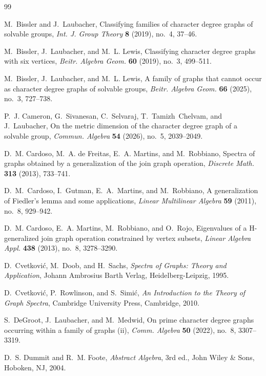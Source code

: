 \documentclass[11pt]{amsart}
\begin{document}
\begin{thebibliography}{99}


M.~Bissler and J.~Laubacher, 
Classifying families of character degree graphs of solvable groups, 
\textit{Int. J. Group Theory} \textbf{8} (2019), no.~4, 37--46.

M.~Bissler, J.~Laubacher, and M.~L. Lewis, 
Classifying character degree graphs with six vertices, 
\textit{Beitr. Algebra Geom.} \textbf{60} (2019), no.~3, 499--511.

M.~Bissler, J.~Laubacher, and M.~L. Lewis, 
A family of graphs that cannot occur as character degree graphs of solvable groups, \textit{Beitr. Algebra Geom.} \textbf{66} (2025), no.~3, 727--738.

P.~J. Cameron, G.~Sivanesan, C.~Selvaraj, T.~Tamizh~Chelvam, and J.~Laubacher, 
On the metric dimension of the character degree graph of a solvable group, 
\textit{Commun. Algebra} \textbf{54} (2026), no.~5, 2039--2049.

D.~M. Cardoso, M.~A. de Freitas, E.~A. Martins, and M.~Robbiano, 
Spectra of graphs obtained by a generalization of the join graph operation, 
\textit{Discrete Math.} \textbf{313} (2013), 733--741.

D.~M.~Cardoso, I.~Gutman, E.~A.~Martins, and M.~Robbiano,
A generalization of Fiedler's lemma and some applications,
\textit{Linear Multilinear Algebra} \textbf{59} (2011), no.~8, 929--942.

D.~M. Cardoso, E.~A. Martins, M.~Robbiano, and O.~Rojo, 
Eigenvalues of a H-generalized join graph operation constrained by vertex subsets, 
\textit{Linear Algebra Appl.} \textbf{438} (2013), no.~8, 3278--3290.

D.~Cvetković, M.~Doob, and H.~Sachs, 
\textit{Spectra of Graphs: Theory and Application}, 
Johann Ambrosius Barth Verlag, Heidelberg-Leipzig, 1995.

D.~Cvetković, P.~Rowlinson, and S.~Simić, 
\textit{An Introduction to the Theory of Graph Spectra}, 
Cambridge University Press, Cambridge, 2010.

S.~DeGroot, J.~Laubacher, and M.~Medwid, 
On prime character degree graphs occurring within a family of graphs (ii), 
\textit{Comm. Algebra} \textbf{50} (2022), no.~8, 3307--3319.

D.~S. Dummit and R.~M. Foote, 
\textit{Abstract Algebra}, 3rd ed., 
John Wiley \& Sons, Hoboken, NJ, 2004.


\end{thebibliography}
\end{document}
